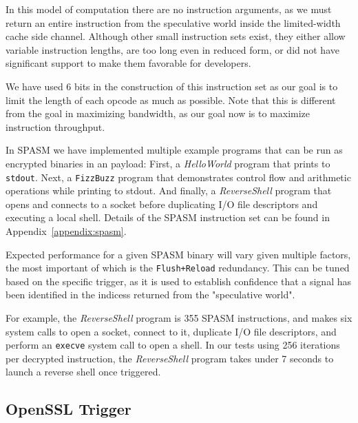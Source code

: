 In this model of computation there are no instruction arguments, as we must
return an entire instruction from the speculative world inside the limited-width
cache side channel. Although other small
instruction sets exist, they either allow variable instruction
lengths, are too long even in reduced form, or did not have significant support
to make them favorable for developers.

We have used 6 bits in the construction of this instruction set as our
goal is to limit the length of each opcode as much as possible. Note that this
is different from the goal in maximizing bandwidth, as our goal now is to
maximize instruction throughput.

In SPASM we have implemented multiple example programs that can be run as
encrypted binaries in an \speculake payload: First, a \textit{HelloWorld}
program that prints to \texttt{stdout}. Next, a \texttt{FizzBuzz} program that
demonstrates control flow and arithmetic operations while printing to stdout.
And finally, a \textit{ReverseShell} program that opens and connects to a socket
before  duplicating I/O file descriptors and executing a local shell. Details of
the SPASM instruction set can be found in Appendix~\ref{appendix:spasm}.

Expected performance for a given SPASM binary will vary given multiple factors, 
the most important of which is the \texttt{Flush+Reload} redundancy. This can be tuned
based on the specific trigger, as it is used to establish confidence that a signal 
has been identified in the indicess returned from the "speculative world". 


For example, the \textit{ReverseShell} program is 355 SPASM instructions, and
makes six system calls to open a socket,
connect to it, duplicate I/O file descriptors, and perform an \texttt{execve}
system call to open a shell.
In our tests using 256 iterations per decrypted instruction, the
\textit{ReverseShell} program takes under 7 seconds to launch a reverse shell
once triggered.


\FigSpasmModel

\subsection{OpenSSL Trigger}
\label{subsec:openssl}

